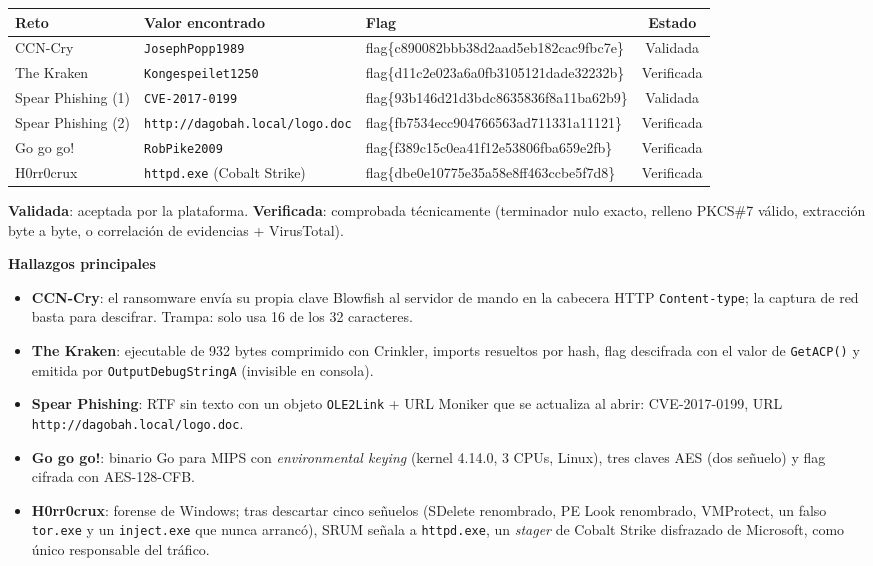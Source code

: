 \documentclass[11pt,a4paper]{article}
\begin{document}
\begin{center}
\footnotesize
\begin{tabularx}{\linewidth}{@{}>{\raggedright\arraybackslash}p{3.1cm} >{\raggedright\arraybackslash}X >{\ttfamily\scriptsize}p{6.1cm} c@{}}
\toprule
\textbf{Reto} & \textbf{Valor encontrado} & \textbf{\normalfont Flag} & \textbf{Estado} \\ \midrule
CCN-Cry & \texttt{JosephPopp1989} & flag\{c890082bbb38d2aad5eb182cac9fbc7e\} & Validada \\
The Kraken & \texttt{Kongespeilet1250} & flag\{d11c2e023a6a0fb3105121dade32232b\} & Verificada \\
Spear Phishing (1) & \texttt{CVE-2017-0199} & flag\{93b146d21d3bdc8635836f8a11ba62b9\} & Validada \\
Spear Phishing (2) & \texttt{http://dagobah.local/logo.doc} & flag\{fb7534ecc904766563ad711331a11121\} & Verificada \\
Go go go! & \texttt{RobPike2009} & flag\{f389c15c0ea41f12e53806fba659e2fb\} & Verificada \\
H0rr0crux & \texttt{httpd.exe} (Cobalt Strike) & flag\{dbe0e10775e35a58e8ff463ccbe5f7d8\} & Verificada \\
\bottomrule
\end{tabularx}
\end{center}

\textbf{Validada}: aceptada por la plataforma. \textbf{Verificada}: comprobada técnicamente (terminador nulo exacto,
relleno PKCS\#7 válido, extracción byte a byte, o correlación de evidencias + VirusTotal).

\textbf{Hallazgos principales}
\begin{itemize}
  \item \textbf{CCN-Cry}: el ransomware envía su propia clave Blowfish al servidor de mando en la cabecera HTTP
        \texttt{Content-type}; la captura de red basta para descifrar. Trampa: solo usa 16 de los 32 caracteres.
  \item \textbf{The Kraken}: ejecutable de 932 bytes comprimido con Crinkler, imports resueltos por hash, flag
        descifrada con el valor de \texttt{GetACP()} y emitida por \texttt{OutputDebugStringA} (invisible en consola).
  \item \textbf{Spear Phishing}: RTF sin texto con un objeto \texttt{OLE2Link} + URL Moniker que se actualiza al abrir:
        CVE-2017-0199, URL \texttt{http://dagobah.local/logo.doc}.
  \item \textbf{Go go go!}: binario Go para MIPS con \emph{environmental keying} (kernel 4.14.0, 3 CPUs, Linux), tres
        claves AES (dos señuelo) y flag cifrada con AES-128-CFB.
  \item \textbf{H0rr0crux}: forense de Windows; tras descartar cinco señuelos (SDelete renombrado, PE Look renombrado,
        VMProtect, un falso \texttt{tor.exe} y un \texttt{inject.exe} que nunca arrancó), SRUM señala a
        \texttt{httpd.exe}, un \emph{stager} de Cobalt Strike disfrazado de Microsoft, como único responsable del tráfico.
\end{itemize}
\end{document}
